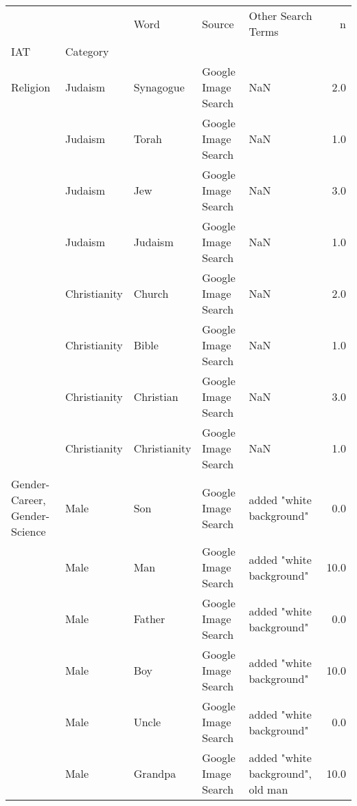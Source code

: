 \begin{tabular}{lllllr}
\toprule
     &                   &               Word &               Source &                                 Other Search Terms &     n \\
IAT & Category &                    &                      &                                                    &       \\
\midrule
Religion & Judaism &          Synagogue &  Google Image Search &                                                NaN &   2.0 \\
     & Judaism &              Torah &  Google Image Search &                                                NaN &   1.0 \\
     & Judaism &                Jew &  Google Image Search &                                                NaN &   3.0 \\
     & Judaism &            Judaism &  Google Image Search &                                                NaN &   1.0 \\
     & Christianity &             Church &  Google Image Search &                                                NaN &   2.0 \\
     & Christianity &              Bible &  Google Image Search &                                                NaN &   1.0 \\
     & Christianity &          Christian &  Google Image Search &                                                NaN &   3.0 \\
     & Christianity &       Christianity &  Google Image Search &                                                NaN &   1.0 \\
Gender-Career, Gender-Science & Male &                Son &  Google Image Search &                           added "white background" &   0.0 \\
     & Male &                Man &  Google Image Search &                           added "white background" &  10.0 \\
     & Male &             Father &  Google Image Search &                           added "white background" &   0.0 \\
     & Male &                Boy &  Google Image Search &                           added "white background" &  10.0 \\
     & Male &              Uncle &  Google Image Search &                           added "white background" &   0.0 \\
     & Male &            Grandpa &  Google Image Search &                  added "white background", old man &  10.0 \\

\end{tabular}
